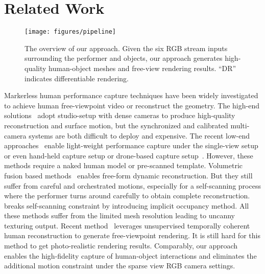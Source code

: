 
\section{Related Work}

  \begin{figure*}[t]
    \centering
    \texttt{[image: figures/pipeline]}
    \vspace{-20pt}
    \caption{The overview of our approach. Given the six RGB stream inputs surrounding the performer and objects, our approach generates high-quality human-object meshes and free-view rendering results. ``DR'' indicates differentiable rendering.
    }
    \vspace{-10pt}
    \label{fig:pipeline}
  \end{figure*}
    
  
Markerless human performance capture techniques have been widely investigated to achieve human free-viewpoint video or reconstruct the geometry. 
%
The high-end solutions~\cite{motion2fusion,TotalCapture,collet2015high,chen2019tightcap} adopt studio-setup with dense cameras to produce high-quality reconstruction and surface motion, but the synchronized and calibrated multi-camera systems are both difficult to deploy and expensive.
%
The recent low-end approaches~\cite{Xiang_2019_CVPR,LiveCap2019tog,chen2021sportscap, he2021challencap} enable light-weight performance capture under the single-view setup or even hand-held capture setup or drone-based capture setup~\cite{xu2017flycap}.
%
However, these methods require a naked human model or pre-scanned template. 
Volumetric fusion based methods~\cite{newcombe2015CVPR,DoubleFusion,BodyFusion,HybridFusion} enables free-form dynamic reconstruction. But they still suffer from careful and orchestrated motions, especially for a self-scanning process where the performer turns around carefully to obtain complete reconstruction. 
%
\cite{robustfusion} breaks self-scanning constraint by introducing implicit occupancy method.
%
 All these methods suffer from the limited mesh resolution leading to uncanny texturing output. Recent method~\cite{mustafa2020temporally} leverages unsupervised temporally coherent human reconstruction to generate free-viewpoint rendering. It is still hard for this method to get photo-realistic rendering results.
%
Comparably, our approach enables the high-fidelity capture of human-object interactions and eliminates the additional motion constraint under the sparse view RGB camera settings.


